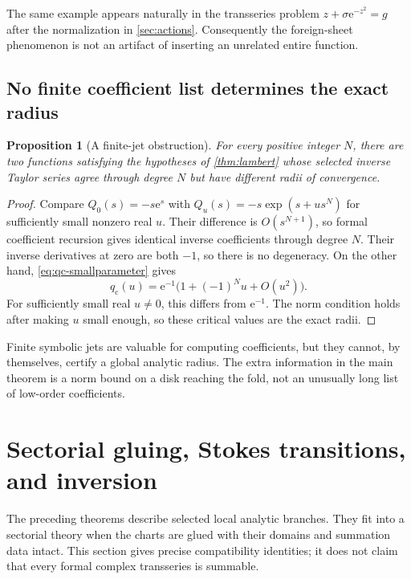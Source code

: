 \documentclass[11pt,a4paper]{article}
\numberwithin{equation}{section}
\newtheorem{proposition}[proposition]{Proposition}
\theoremstyle{definition}
\theoremstyle{remark}
\newcommand{\e}{\mathrm e}
\newcommand{\qcv}{q_{\mathrm c}}
\begin{document}
The same example appears naturally in the transseries problem
$z+\sigma\e^{-z^2}=g$ after the normalization in \cref{sec:actions}. Consequently the foreign-sheet phenomenon is not an artifact of inserting an unrelated entire function.

\subsection{No finite coefficient list determines the exact radius}
\begin{proposition}[A finite-jet obstruction]
\label{prop:finitejet}
For every positive integer $N$, there are two functions satisfying the hypotheses of \cref{thm:lambert} whose selected inverse Taylor series agree through degree $N$ but have different radii of convergence.
\end{proposition}
\begin{proof}
Compare $Q_0(s)=-s\e^s$ with
$Q_u(s)=-s\exp(s+us^N)$ for sufficiently small nonzero real $u$. Their difference is $O(s^{N+1})$, so formal coefficient recursion gives identical inverse coefficients through degree $N$. Their inverse derivatives at zero are both $-1$, so there is no degeneracy. On the other hand, \eqref{eq:qc-smallparameter} gives
\[
 \qcv(u)=\e^{-1}\bigl(1+(-1)^Nu+O(u^2)\bigr).
\]
For sufficiently small real $u\neq0$, this differs from $\e^{-1}$. The norm condition holds after making $u$ small enough, so these critical values are the exact radii.
\end{proof}

Finite symbolic jets are valuable for computing coefficients, but they cannot, by themselves, certify a global analytic radius. The extra information in the main theorem is a norm bound on a disk reaching the fold, not an unusually long list of low-order coefficients.

\section{Sectorial gluing, Stokes transitions, and inversion}
\label{sec:stokes}
The preceding theorems describe selected local analytic branches. They fit into a sectorial theory when the charts are glued with their domains and summation data intact. This section gives precise compatibility identities; it does not claim that every formal complex transseries is summable.
\end{document}
